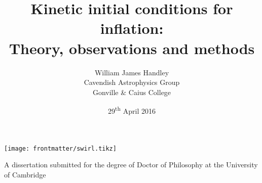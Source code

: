 \title{Kinetic initial conditions for inflation:\\ {\large Theory, observations and methods}}

\author{William James Handley\\
Cavendish Astrophysics Group \\
Gonville \& Caius College}
\date{29\textsuperscript{th} April 2016}

\begin{titlingpage}
\maketitle
\begin{center}
  \texttt{[image: frontmatter/swirl.tikz]}

  A dissertation submitted for the degree of Doctor of Philosophy
  at the University of Cambridge 
\end{center}

\end{titlingpage}

